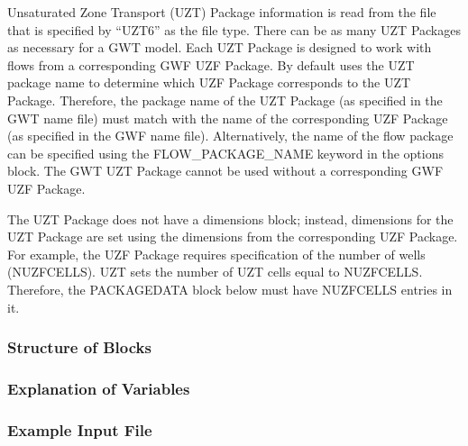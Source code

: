 Unsaturated Zone Transport (UZT) Package information is read from the file that is specified by ``UZT6'' as the file type.  There can be as many UZT Packages as necessary for a GWT model. Each UZT Package is designed to work with flows from a corresponding GWF UZF Package. By default \mf uses the UZT package name to determine which UZF Package corresponds to the UZT Package.  Therefore, the package name of the UZT Package (as specified in the GWT name file) must match with the name of the corresponding UZF Package (as specified in the GWF name file).  Alternatively, the name of the flow package can be specified using the FLOW\_PACKAGE\_NAME keyword in the options block.  The GWT UZT Package cannot be used without a corresponding GWF UZF Package.

The UZT Package does not have a dimensions block; instead, dimensions for the UZT Package are set using the dimensions from the corresponding UZF Package.  For example, the UZF Package requires specification of the number of wells (NUZFCELLS).  UZT sets the number of UZT cells equal to NUZFCELLS.  Therefore, the PACKAGEDATA block below must have NUZFCELLS entries in it.

\vspace{5mm}
\subsubsection{Structure of Blocks}




\vspace{5mm}
\subsubsection{Explanation of Variables}
\begin{description}

\end{description}

\vspace{5mm}
\subsubsection{Example Input File}


\vspace{5mm}
